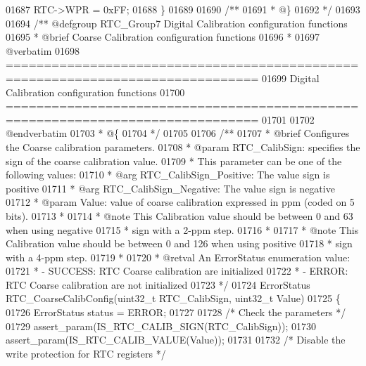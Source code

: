 \begin{DoxyCode}
01687   RTC->WPR = 0xFF;
01688 \}
01689 
01690 \textcolor{comment}{/**}
01691 \textcolor{comment}{  * @\}}
01692 \textcolor{comment}{  */}
01693 
01694 \textcolor{comment}{/** @defgroup RTC\_Group7 Digital Calibration configuration functions}
01695 \textcolor{comment}{ *  @brief   Coarse Calibration configuration functions }
01696 \textcolor{comment}{ *}
01697 \textcolor{comment}{@verbatim   }
01698 \textcolor{comment}{ ===============================================================================}
01699 \textcolor{comment}{                  Digital Calibration configuration functions}
01700 \textcolor{comment}{ ===============================================================================  }
01701 \textcolor{comment}{}
01702 \textcolor{comment}{@endverbatim}
01703 \textcolor{comment}{  * @\{}
01704 \textcolor{comment}{  */}
01705 
01706 \textcolor{comment}{/**}
01707 \textcolor{comment}{  * @brief  Configures the Coarse calibration parameters.}
01708 \textcolor{comment}{  * @param  RTC\_CalibSign: specifies the sign of the coarse calibration value.}
01709 \textcolor{comment}{  *          This parameter can be  one of the following values:}
01710 \textcolor{comment}{  *            @arg RTC\_CalibSign\_Positive: The value sign is positive }
01711 \textcolor{comment}{  *            @arg RTC\_CalibSign\_Negative: The value sign is negative}
01712 \textcolor{comment}{  * @param  Value: value of coarse calibration expressed in ppm (coded on 5 bits).}
01713 \textcolor{comment}{  *    }
01714 \textcolor{comment}{  * @note   This Calibration value should be between 0 and 63 when using negative}
01715 \textcolor{comment}{  *         sign with a 2-ppm step.}
01716 \textcolor{comment}{  *           }
01717 \textcolor{comment}{  * @note   This Calibration value should be between 0 and 126 when using positive}
01718 \textcolor{comment}{  *         sign with a 4-ppm step.}
01719 \textcolor{comment}{  *           }
01720 \textcolor{comment}{  * @retval An ErrorStatus enumeration value:}
01721 \textcolor{comment}{  *          - SUCCESS: RTC Coarse calibration are initialized}
01722 \textcolor{comment}{  *          - ERROR: RTC Coarse calibration are not initialized     }
01723 \textcolor{comment}{  */}
01724 ErrorStatus RTC_CoarseCalibConfig(uint32\_t RTC\_CalibSign, uint32\_t Value)
01725 \{
01726   ErrorStatus status = ERROR;
01727 
01728   \textcolor{comment}{/* Check the parameters */}
01729   assert_param(IS\_RTC\_CALIB\_SIGN(RTC\_CalibSign));
01730   assert_param(IS\_RTC\_CALIB\_VALUE(Value));
01731 
01732   \textcolor{comment}{/* Disable the write protection for RTC registers */}

\end{DoxyCode}
